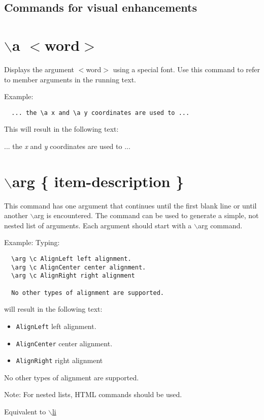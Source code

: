  \subsection*{ Commands for visual enhancements }\hypertarget{commands_cmda}{}\section{$\backslash$a $<$word$>$}\label{commands_cmda}
 Displays the argument $<$word$>$ using a special font. Use this command to refer to member arguments in the running text.

\begin{Desc}
\item[Example:]

\footnotesize\begin{verbatim}
  ... the \a x and \a y coordinates are used to ...
  \end{verbatim}
\normalsize
 This will result in the following text:\par
\par
 ... the {\em x\/} and {\em y\/} coordinates are used to ...\end{Desc}


 \hypertarget{commands_cmdarg}{}\section{$\backslash$arg \{ item-description \}}\label{commands_cmdarg}
 This command has one argument that continues until the first blank line or until another $\backslash$arg is encountered. The command can be used to generate a simple, not nested list of arguments. Each argument should start with a $\backslash$arg command.

\begin{Desc}
\item[Example:]Typing: 

\footnotesize\begin{verbatim}
  \arg \c AlignLeft left alignment.
  \arg \c AlignCenter center alignment.
  \arg \c AlignRight right alignment
  
  No other types of alignment are supported.
  \end{verbatim}
\normalsize
 will result in the following text:\par
\par
 \begin{itemize}
\item {\tt AlignLeft} left alignment. \item {\tt AlignCenter} center alignment. \item {\tt AlignRight} right alignment \end{itemize}
\par
 No other types of alignment are supported.\end{Desc}
\begin{Desc}
\item[Note:]For nested lists, HTML commands should be used.\end{Desc}
Equivalent to \hyperlink{commands_cmdli}{$\backslash$li}



